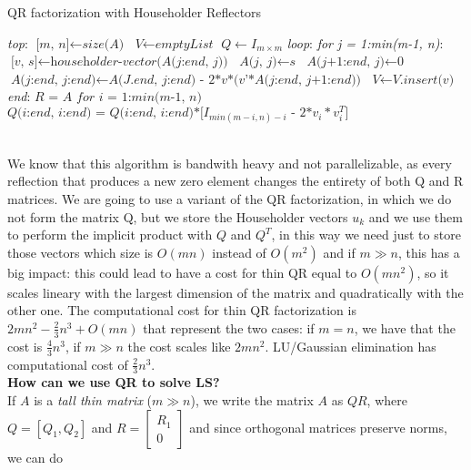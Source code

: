 \documentclass{article}
\begin{document}
\begin{algorithm}
\caption{QR factorization with Householder Reflectors}\label{euclid}
\begin{algorithmic}[1]
\BState \emph{top}:
\State $\textit{[m, n]} \gets \textit{size(A)}$
\State $\textit{V} \gets \textit{emptyList}$
\State $\textit{Q} \gets \textit{$I_{m \times m}$}$
\BState \emph{loop}:
\State \emph{for j = 1:min(m-1, n)}:
\State \quad$\textit{[v, s]} \gets \textit{householder-vector(A(j:end, j))}$
\State \quad$\textit{A(j, j)} \gets \textit{s}$
\State \quad$\textit{A(j+1:end, j)} \gets \textit{0}$
\State \quad$\textit{A(j:end, j:end)} \gets \textit{A(J.end, j:end) - 2*v*(v'*A(j:end, j+1:end))}$
\State \quad$\textit{V} \gets \textit{V.insert(v)}$
\BState \emph{end}:
\State $\textit{R = A}$
\State $\textit{for i = 1:min(m-1, n)}$
\State \quad$\textit{Q(i:end, i:end) = Q(i:end, i:end)*[$I_{min(m-i, n) - i}$ - 2*$v_{i}*v_{i}^{T}]$}$
\EndFunction
\end{algorithmic}
\end{algorithm}
\\We know that this algorithm is bandwith heavy and not parallelizable, as every reflection that produces a new zero element changes the entirety of both Q and R matrices.
We are going to use a variant of the QR factorization, in which we do not form the matrix Q, but we store the Householder vectors $u_k$ and we use them to perform the implicit product with $Q$ and $Q^T$, in this way we need just to store those vectors which size is $O(mn)$ instead of $O(m^2)$ and if $m \gg n$, this has a big impact: this could lead to have a cost for thin QR equal to $O(mn^2)$, so it scales lineary with the largest dimension of the matrix and quadratically with the other one. The computational cost for thin QR factorization is $2mn^2 - \frac{2}{3}n^3 + O(mn)$ that represent the two cases: if $m = n$, we have that the cost is $\frac{4}{3}n^3$, if $m \gg n$ the cost scales like $2mn^2$. LU/Gaussian elimination has computational cost of $\frac{2}{3}n^3$.
\\\textbf{How can we use QR to solve LS?}\\
If $A$ is a \textit{tall thin matrix} ($m \gg n$), we write the matrix $A$ as $QR$, where
$Q = [Q_1, Q_2]$ and
$R = \begin{bmatrix}R_{1} \\ 0\end{bmatrix}$ and since orthogonal matrices preserve norms, we can do
\end{document}
